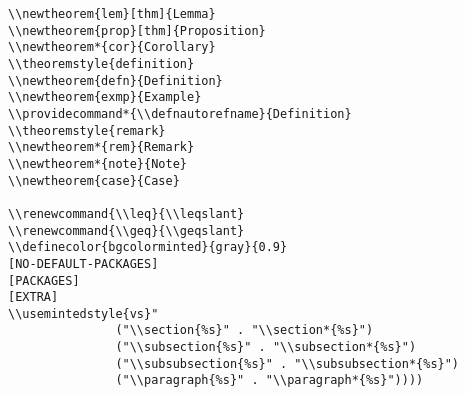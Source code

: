 \documentclass[c]{article}
\theoremstyle{plain}%
\theoremstyle{definition}
\providecommand*{\defnautorefname}{Definition}
\theoremstyle{remark}
\renewcommand{\leq}{\leqslant}
\renewcommand{\geq}{\geqslant}
\begin{document}
\begin{verbatim}
\\newtheorem{lem}[thm]{Lemma}
\\newtheorem{prop}[thm]{Proposition}
\\newtheorem*{cor}{Corollary}
\\theoremstyle{definition}
\\newtheorem{defn}{Definition}
\\newtheorem{exmp}{Example}
\\providecommand*{\\defnautorefname}{Definition}
\\theoremstyle{remark}
\\newtheorem*{rem}{Remark}
\\newtheorem*{note}{Note}
\\newtheorem{case}{Case}

\\renewcommand{\\leq}{\\leqslant}
\\renewcommand{\\geq}{\\geqslant}
\\definecolor{bgcolorminted}{gray}{0.9}
[NO-DEFAULT-PACKAGES]
[PACKAGES]
[EXTRA]
\\usemintedstyle{vs}"
               ("\\section{%s}" . "\\section*{%s}")
               ("\\subsection{%s}" . "\\subsection*{%s}")
               ("\\subsubsection{%s}" . "\\subsubsection*{%s}")
               ("\\paragraph{%s}" . "\\paragraph*{%s}"))))
\end{verbatim}
\end{document}
